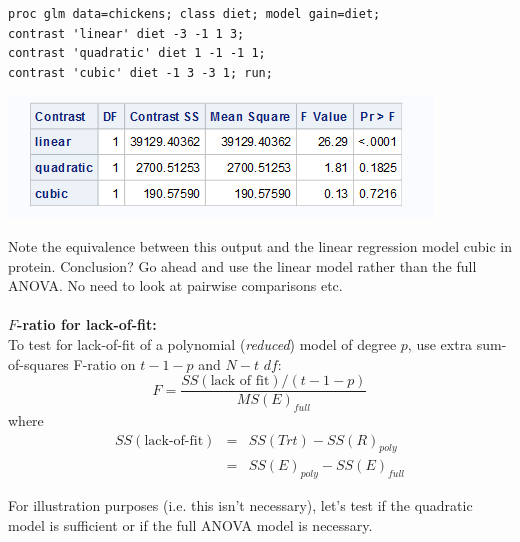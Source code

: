 \begin{small}
\begin{verbatim}
proc glm data=chickens; class diet; model gain=diet;
contrast 'linear' diet -3 -1 1 3;
contrast 'quadratic' diet 1 -1 -1 1;
contrast 'cubic' diet -1 3 -3 1; run;
\end{verbatim}
\end{small}

\begin{center}
\includegraphics[scale=0.8]{ChickensGLM3}
\end{center}

Note the equivalence between this output and the linear regression model cubic in protein.  Conclusion?  Go ahead and use the linear model rather than the full ANOVA.  No need to look at pairwise comparisons etc.\\~\\

\textbf{$F$-ratio for lack-of-fit:}\\ 
To test for lack-of-fit of a polynomial ({\em reduced}) model of degree $p$, use extra sum-of-squares F-ratio on $t-1-p$ and $N-t$ $df$:
$$ F=\frac{SS(\mbox{lack of fit})/(t-1-p)}{MS(E)_{full}}$$
where
\begin{eqnarray*}
SS(\mbox{lack-of-fit})  &=&  SS(Trt)-SS(R)_{poly} \\
&=&  SS(E)_{poly}-SS(E)_{full}
\end{eqnarray*}

For illustration purposes (i.e. this isn't necessary), let's test if the quadratic model is sufficient or if the full ANOVA model is necessary.
\color{black}



